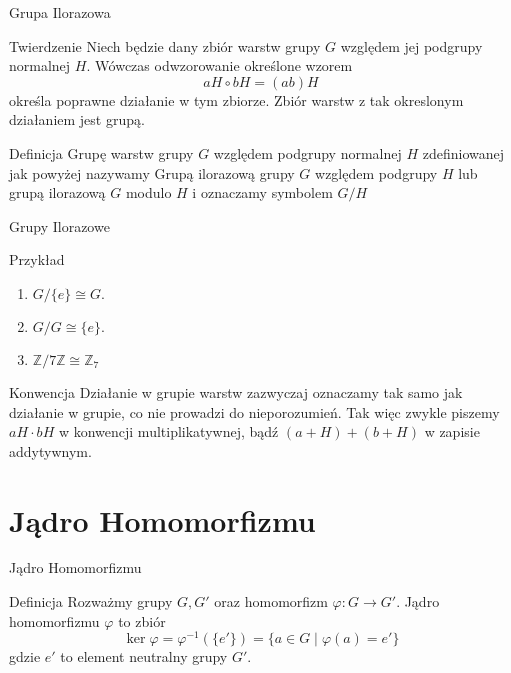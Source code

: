\documentclass{beamer}
\let\phi\varphi
\begin{document}
\begin{frame}{Grupa Ilorazowa}
    \begin{block}{Twierdzenie}
        Niech będzie dany zbiór warstw grupy $G$ względem jej podgrupy normalnej $H$.
        Wówczas odwzorowanie określone wzorem
        $$aH \circ bH = (ab)H $$
        określa poprawne działanie w tym zbiorze. Zbiór warstw z tak okreslonym działaniem jest grupą.
    \end{block}
    \pause 
    \begin{block}{Definicja}
        Grupę warstw grupy $G$ względem podgrupy normalnej $H$ zdefiniowanej jak powyżej nazywamy
        \alert{Grupą ilorazową} grupy $G$ względem podgrupy $H$ lub grupą ilorazową $G$ modulo $H$ i oznaczamy symbolem $G/H$
    \end{block}
\end{frame}

\begin{frame}{Grupy Ilorazowe}
    \begin{exampleblock}{Przykład}
        \begin{enumerate}
            \item $G/\{e\} \cong G.$
            \item $G/G \cong \{e\}.$
            \item $\mathbb{Z} / 7\mathbb{Z} \cong \mathbb{Z}_7$
        \end{enumerate}
    \end{exampleblock}

\begin{alertblock}{Konwencja}
    Działanie w grupie warstw zazwyczaj oznaczamy tak samo jak działanie w grupie, co nie prowadzi do nieporozumień.
    Tak więc zwykle piszemy $aH \cdot bH$ w konwencji multiplikatywnej, bądź $(a + H) + (b + H)$ w zapisie addytywnym. 
\end{alertblock}
\end{frame}

\section{Jądro Homomorfizmu}

\begin{frame}{Jądro Homomorfizmu}
    \begin{block}{Definicja}
        Rozważmy grupy $G, G'$ oraz homomorfizm $\phi : G \rightarrow G'$. Jądro homomorfizmu $\phi$ to zbiór
        $$\ker \phi = \phi^{-1}(\{e'\}) = \{ a \in G \mid \phi(a) = e' \}  $$
        gdzie $e'$ to element neutralny grupy $G'$.
    \end{block}
\end{frame}
\end{document}
